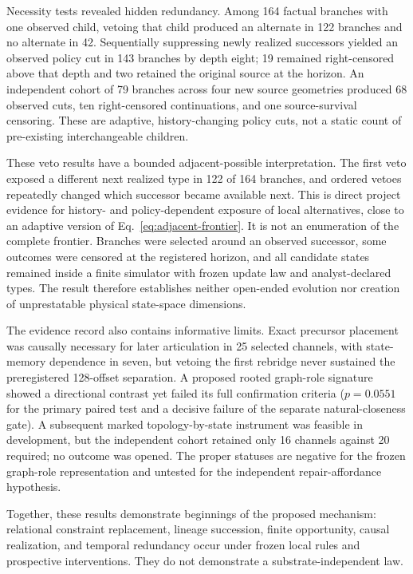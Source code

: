 Necessity tests revealed hidden redundancy. Among 164 factual branches with one
observed child, vetoing that child produced an alternate in 122 branches and no
alternate in 42. Sequentially suppressing newly realized successors yielded an
observed policy cut in 143 branches by depth eight; 19 remained right-censored
above that depth and two retained the original source at the horizon. An
independent cohort of 79 branches across four new source geometries produced 68
observed cuts, ten right-censored continuations, and one source-survival
censoring. These are adaptive, history-changing policy cuts, not a static count
of pre-existing interchangeable children.

These veto results have a bounded adjacent-possible interpretation. The first
veto exposed a different next realized type in 122 of 164 branches, and ordered
vetoes repeatedly changed which successor became available next. This is direct
project evidence for history- and policy-dependent exposure of local
alternatives, close to an adaptive version of
Eq.~\eqref{eq:adjacent-frontier}. It is not an enumeration of the complete
frontier. Branches were selected around an observed successor, some outcomes
were censored at the registered horizon, and all candidate states remained
inside a finite simulator with frozen update law and analyst-declared types.
The result therefore establishes neither open-ended evolution nor creation of
unprestatable physical state-space dimensions.

The evidence record also contains informative limits. Exact precursor placement
was causally necessary for later articulation in 25 selected channels, with
state-memory dependence in seven, but vetoing the first rebridge never sustained
the preregistered 128-offset separation. A proposed rooted graph-role signature
showed a directional contrast yet failed its full confirmation criteria
($p=0.0551$ for the primary paired test and a decisive failure of the separate
natural-closeness gate). A subsequent marked topology-by-state instrument was
feasible in development, but the independent cohort retained only 16 channels
against 20 required; no outcome was opened. The proper statuses are negative
for the frozen graph-role representation and untested for the independent
repair-affordance hypothesis.

Together, these results demonstrate beginnings of the proposed mechanism:
relational constraint replacement, lineage succession, finite opportunity,
causal realization, and temporal redundancy occur under frozen local rules and
prospective interventions. They do not demonstrate a substrate-independent
law.

